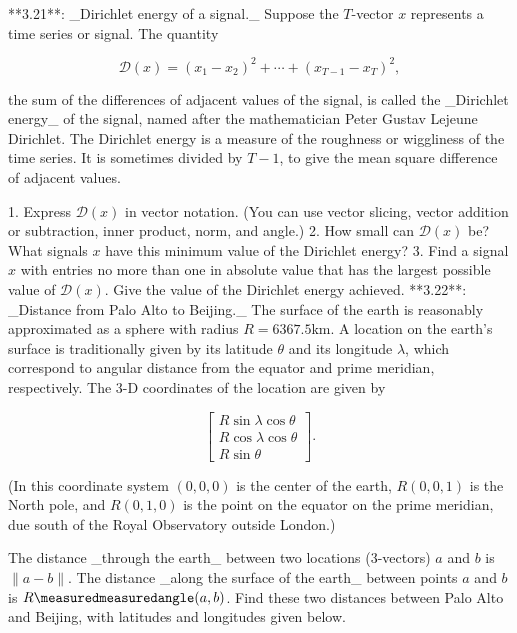 

**3.21**: _Dirichlet energy of a signal._ Suppose the \(T\)-vector \(x\) represents a time series or signal. The quantity

\[\mathcal{D}(x)=(x_{1}-x_{2})^{2}+\cdots+(x_{T-1}-x_{T})^{2},\]

the sum of the differences of adjacent values of the signal, is called the _Dirichlet energy_ of the signal, named after the mathematician Peter Gustav Lejeune Dirichlet. The Dirichlet energy is a measure of the roughness or wiggliness of the time series. It is sometimes divided by \(T-1\), to give the mean square difference of adjacent values.

1. Express \(\mathcal{D}(x)\) in vector notation. (You can use vector slicing, vector addition or subtraction, inner product, norm, and angle.)
2. How small can \(\mathcal{D}(x)\) be? What signals \(x\) have this minimum value of the Dirichlet energy?
3. Find a signal \(x\) with entries no more than one in absolute value that has the largest possible value of \(\mathcal{D}(x)\). Give the value of the Dirichlet energy achieved.
**3.22**: _Distance from Palo Alto to Beijing._ The surface of the earth is reasonably approximated as a sphere with radius \(R=6367.5\)km. A location on the earth's surface is traditionally given by its latitude \(\theta\) and its longitude \(\lambda\), which correspond to angular distance from the equator and prime meridian, respectively. The 3-D coordinates of the location are given by

\[\left[\begin{array}{c}R\sin\lambda\cos\theta\\ R\cos\lambda\cos\theta\\ R\sin\theta\end{array}\right].\]

(In this coordinate system \((0,0,0)\) is the center of the earth, \(R(0,0,1)\) is the North pole, and \(R(0,1,0)\) is the point on the equator on the prime meridian, due south of the Royal Observatory outside London.)

The distance _through the earth_ between two locations (3-vectors) \(a\) and \(b\) is \(\|a-b\|\). The distance _along the surface of the earth_ between points \(a\) and \(b\) is \(R\measuredmeasuredangle(a,b)\). Find these two distances between Palo Alto and Beijing, with latitudes and longitudes given below.

